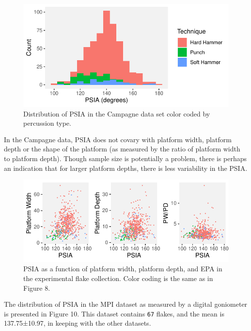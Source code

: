 \documentclass[10pt,letterpaper]{article}
\begin{document}
\begin{figure}
\centering
\includegraphics{PSIA_Manuscript_files/figure-latex/fig8-camp_angles-1.pdf}
\caption{Distribution of PSIA in the Campagne data set color coded by
percussion type.}
\end{figure}

In the Campagne data, PSIA does not covary with platform width, platform
depth or the shape of the platform (as measured by the ratio of platform
width to platform depth). Though sample size is potentially a problem,
there is perhaps an indication that for larger platform depths, there is
less variability in the PSIA.

\begin{figure}
\centering
\includegraphics{PSIA_Manuscript_files/figure-latex/fig9-PSIA_to_other_measaures-1.pdf}
\caption{PSIA as a function of platform width, platform depth, and EPA
in the experimental flake collection. Color coding is the same as in
Figure 8.}
\end{figure}

The distribution of PSIA in the MPI dataset as measured by a digital
goniometer is presented in Figure 10. This dataset contains \texttt{67}
flakes, and the mean is 137.75±10.97, in keeping with the other
datasets.
\end{document}

